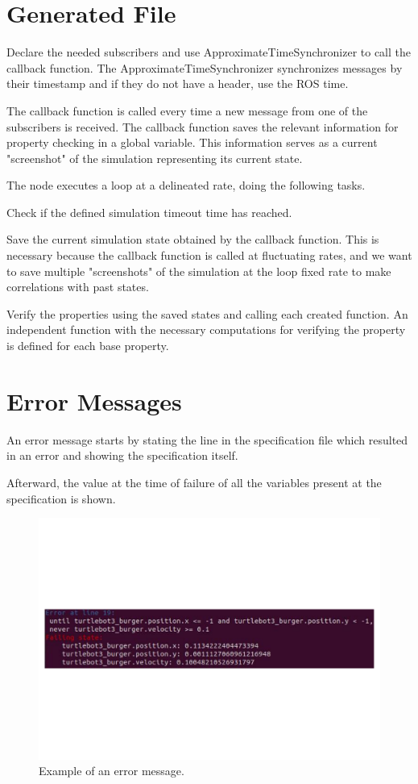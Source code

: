 \section{Generated File}

Declare the needed subscribers and use ApproximateTimeSynchronizer to call the callback function. The ApproximateTimeSynchronizer synchronizes messages by their timestamp and if they do not have a header, use the ROS time.

The callback function is called every time a new message from one of the subscribers is received. The callback function saves the relevant information for property checking in a global variable. This information serves as a current "screenshot" of the simulation representing its current state.

The node executes a loop at a delineated rate, doing the following tasks. 

Check if the defined simulation timeout time has reached. 

Save the current simulation state obtained by the callback function. This is necessary because the callback function is called at fluctuating rates, and we want to save multiple "screenshots" of the simulation at the loop fixed rate to make correlations with past states. 

Verify the properties using the saved states and calling each created function. An independent function with the necessary computations for verifying the property is defined for each base property.


\section{Error Messages}

An error message starts by stating the line in the specification file which resulted in an error and showing the specification itself.

Afterward, the value at the time of failure of all the variables present at the specification is shown.

\begin{figure}[h]
\includegraphics[width=\textwidth]{images/error_message.pdf}
\caption{Example of an error message.} \label{fig2}
\end{figure}